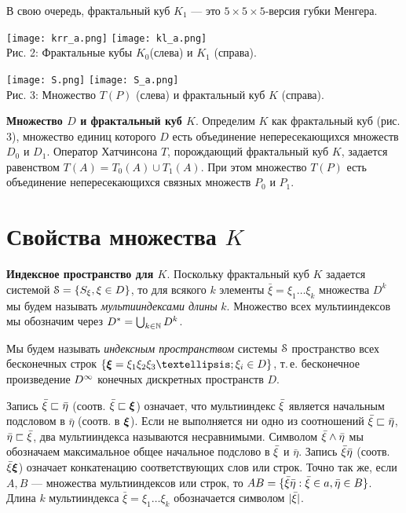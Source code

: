 В свою очередь, фрактальный куб $ K_1$ --- это $ 5\times 5\times 5 $-версия губки Менгера.



\begin{center}
\qquad\qquad
\texttt{[image: krr\_a.png]}
\hfill
\texttt{[image: kl\_a.png]}\qquad\qquad\\
[1ex]
{\footnotesize Рис. 2: Фрактальные кубы $K_0$(слева)  и  $K_1$ (справа).}
\end{center}

\begin{center}
\qquad\qquad\texttt{[image: S.png]}
\hfill
\texttt{[image: S\_a.png]}\qquad\qquad\\
[1ex]
{\footnotesize Рис. 3: Множество $T(P)$ (слева)  и фрактальный куб $K$ (справа).}
\end{center}



{\bf Множество $ D$ и фрактальный куб $K$}.  
Определим $K$ как фрактальный куб (рис. 3), множество единиц которого  $ D$ есть объединение непересекающихся множеств $ D_0$  и  $ D_1$. 
Оператор Хатчинсона $T$, порождающий фрактальный куб $K$, задается равенством $T(A)=T_0(A)\cup T_1(A)$. 
При этом множество $T(P)$ есть объединение непересекающихся связных множеств $P_0$  и $P_1$.




\section{Свойства множества $K$}

{\bf Индексное пространство для $K$}.
Поскольку фрактальный куб $K$ задается системой ${\EuScript S}=\{S_\xi, \xi\in D\}$, то
для всякого $k$ элементы $\bar\xi=\xi_1\ldots\xi_k$ множества $ D^k$ мы будем называть {\it мультииндексами длины} $k$.
Множество всех мультииндексов мы обозначим через $ D^*=\bigcup_{k\in\mathbb{N}} D^k$.

Мы будем называть {\em индексным пространством} системы ${\EuScript S}$  пространство всех бесконечных строк  $\{\bmx=\xi_1\xi_2\xi_3…;\xi_i\in  D\}$, т.\,е. бесконечное произведение $D^\infty$ конечных дискретных пространств $D$.

Запись ${\bar{\xi}}\sqsubset \bar\eta$ (соотв. ${\bar{\xi}}\sqsubset {\bm{\xi}}$) означает, что мультииндекс ${\bar{\xi}}$ является начальным подсловом в $\bar\eta$ (соотв. в ${\bm{\xi}}$).
Если не выполняется ни одно из соотношений ${\bar{\xi}}\sqsubset \bar\eta$, $ \bar\eta\sqsubset{\bar{\xi}}$, два мультииндекса называются несравнимыми. 
Символом ${\bar{\xi}}\wedge \bar\eta$ мы обозначаем максимальное общее начальное подслово в ${\bar{\xi}}$  и  $\bar\eta$. 
Запись ${\bar{\xi}}\bar\eta$ (соотв. ${\bar{\xi}}{\bm{\xi}}$) означает конкатенацию соответствующих слов или строк. 
Точно так же, если $A,B$ --- множества мультииндексов или строк, то $AB=\{{\bar{\xi}}\bar\eta: {\bar{\xi}}\in a,\bar\eta\in B\}$.   
Длина $k$ мультииндекса $\bar\xi=\xi_1\ldots\xi_k$ обозначается символом $|{\bar{\xi}}|$.

